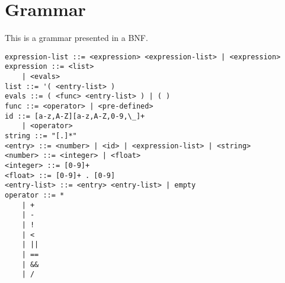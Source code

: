 


\section{Grammar}

This is a grammar presented in a BNF. 


\begin{lstlisting}
expression-list ::= <expression> <expression-list> | <expression>
expression ::= <list> 
	| <evals>
list ::= '( <entry-list> )
evals ::= ( <func> <entry-list> ) | ( ) 
func ::= <operator> | <pre-defined>
id ::= [a-z,A-Z][a-z,A-Z,0-9,\_]+
	| <operator> 
string ::= "[.]*"
<entry> ::= <number> | <id> | <expression-list> | <string>
<number> ::= <integer> | <float> 
<integer> ::= [0-9]+
<float> ::= [0-9]+ . [0-9]
<entry-list> ::= <entry> <entry-list> | empty
operator ::= *
	| +
	| -
	| !
	| < 
	| ||
	| ==
	| &&
	| /
\end{lstlisting}
